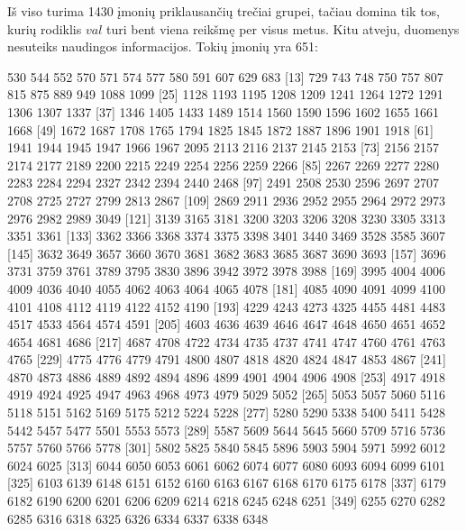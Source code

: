 \documentclass[a4paper]{article}
\begin{document}
Iš viso turima 1430 įmonių priklausančių trečiai grupei, tačiau domina
tik tos, kurių rodiklis $val$ turi bent viena reikšmę per visus metus.
Kitu atveju, duomenys nesuteiks naudingos informacijos. Tokių įmonių
yra 651:
\begin{Schunk}
\begin{Soutput}
  [1]   530   544   552   570   571   574   577   580   591   607   629   683
 [13]   729   743   748   750   757   807   815   875   889   949  1088  1099
 [25]  1128  1193  1195  1208  1209  1241  1264  1272  1291  1306  1307  1337
 [37]  1346  1405  1433  1489  1514  1560  1590  1596  1602  1655  1661  1668
 [49]  1672  1687  1708  1765  1794  1825  1845  1872  1887  1896  1901  1918
 [61]  1941  1944  1945  1947  1966  1967  2095  2113  2116  2137  2145  2153
 [73]  2156  2157  2174  2177  2189  2200  2215  2249  2254  2256  2259  2266
 [85]  2267  2269  2277  2280  2283  2284  2294  2327  2342  2394  2440  2468
 [97]  2491  2508  2530  2596  2697  2707  2708  2725  2727  2799  2813  2867
[109]  2869  2911  2936  2952  2955  2964  2972  2973  2976  2982  2989  3049
[121]  3139  3165  3181  3200  3203  3206  3208  3230  3305  3313  3351  3361
[133]  3362  3366  3368  3374  3375  3398  3401  3440  3469  3528  3585  3607
[145]  3632  3649  3657  3660  3670  3681  3682  3683  3685  3687  3690  3693
[157]  3696  3731  3759  3761  3789  3795  3830  3896  3942  3972  3978  3988
[169]  3995  4004  4006  4009  4036  4040  4055  4062  4063  4064  4065  4078
[181]  4085  4090  4091  4099  4100  4101  4108  4112  4119  4122  4152  4190
[193]  4229  4243  4273  4325  4455  4481  4483  4517  4533  4564  4574  4591
[205]  4603  4636  4639  4646  4647  4648  4650  4651  4652  4654  4681  4686
[217]  4687  4708  4722  4734  4735  4737  4741  4747  4760  4761  4763  4765
[229]  4775  4776  4779  4791  4800  4807  4818  4820  4824  4847  4853  4867
[241]  4870  4873  4886  4889  4892  4894  4896  4899  4901  4904  4906  4908
[253]  4917  4918  4919  4924  4925  4947  4963  4968  4973  4979  5029  5052
[265]  5053  5057  5060  5116  5118  5151  5162  5169  5175  5212  5224  5228
[277]  5280  5290  5338  5400  5411  5428  5442  5457  5477  5501  5553  5573
[289]  5587  5609  5644  5645  5660  5709  5716  5736  5757  5760  5766  5778
[301]  5802  5825  5840  5845  5896  5903  5904  5971  5992  6012  6024  6025
[313]  6044  6050  6053  6061  6062  6074  6077  6080  6093  6094  6099  6101
[325]  6103  6139  6148  6151  6152  6160  6163  6167  6168  6170  6175  6178
[337]  6179  6182  6190  6200  6201  6206  6209  6214  6218  6245  6248  6251
[349]  6255  6270  6282  6285  6316  6318  6325  6326  6334  6337  6338  6348

\end{Soutput}
\end{Schunk}
\end{document}
